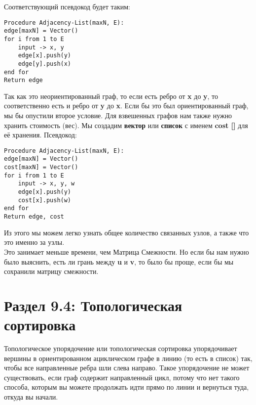 \vspace{\baselineskip}

Соответствующий псевдокод будет таким:

\begin{tcolorbox}
\begin{verbatim}
Procedure Adjacency-List(maxN, E):
edge[maxN] = Vector()
for i from 1 to E
    input -> x, y
    edge[x].push(y)
    edge[y].push(x)
end for
Return edge
\end{verbatim}
\end{tcolorbox}

Так как это неориентированный граф, то если есть ребро от \textbf{x} до \textbf{y}, то соответственно есть и ребро от \textbf{y} до \textbf{x}. Если бы это был ориентированный граф, мы бы опустили второе условие. Для взвешенных графов нам также нужно хранить стоимость (вес). Мы создадим \textbf{вектор} или \textbf{список} с именем \textbf{cost []} для её хранения. Псевдокод:

\begin{tcolorbox}
\begin{verbatim}
Procedure Adjacency-List(maxN, E):
edge[maxN] = Vector()
cost[maxN] = Vector()
for i from 1 to E
    input -> x, y, w
    edge[x].push(y)
    cost[x].push(w)
end for
Return edge, cost
\end{verbatim}
\end{tcolorbox}

Из этого мы можем легко узнать общее количество связанных узлов, а также что это именно за узлы. \\
Это занимает меньше времени, чем Матрица Смежности. Но если бы нам нужно было выяснить, есть ли грань между \textbf{u} и \textbf{v}, то было бы проще, если бы мы сохранили матрицу смежности.

\section*{Раздел 9.4: Топологическая сортировка}

Топологическое упорядочение или топологическая сортировка упорядочивает вершины в ориентированном ациклическом графе в линию (то есть в список) так, чтобы все направленные ребра шли слева направо. Такое упорядочение не может существовать, если граф содержит направленный цикл, потому что нет такого способа, которым вы можете продолжать идти прямо по линии и вернуться туда, откуда вы начали.

\vspace{\baselineskip}

